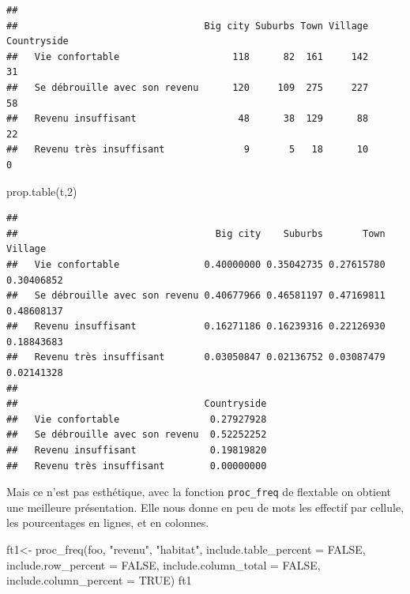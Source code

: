 \documentclass[
]{book}
\newenvironment{Shaded}{\begin{snugshade}}{\end{snugshade}}
\newcommand{\AttributeTok}[1]{\textcolor[rgb]{0.77,0.63,0.00}{#1}}
\newcommand{\ConstantTok}[1]{\textcolor[rgb]{0.00,0.00,0.00}{#1}}
\newcommand{\DecValTok}[1]{\textcolor[rgb]{0.00,0.00,0.81}{#1}}
\newcommand{\FunctionTok}[1]{\textcolor[rgb]{0.00,0.00,0.00}{#1}}
\newcommand{\NormalTok}[1]{#1}
\newcommand{\OtherTok}[1]{\textcolor[rgb]{0.56,0.35,0.01}{#1}}
\newcommand{\SpecialCharTok}[1]{\textcolor[rgb]{0.00,0.00,0.00}{#1}}
\newcommand{\StringTok}[1]{\textcolor[rgb]{0.31,0.60,0.02}{#1}}
\begin{document}
\begin{Shaded}
\end{Shaded}

\begin{verbatim}
##                                
##                                 Big city Suburbs Town Village Countryside
##   Vie confortable                    118      82  161     142          31
##   Se débrouille avec son revenu      120     109  275     227          58
##   Revenu insuffisant                  48      38  129      88          22
##   Revenu très insuffisant              9       5   18      10           0
\end{verbatim}

\begin{Shaded}
\begin{Highlighting}[]
\FunctionTok{prop.table}\NormalTok{(t,}\DecValTok{2}\NormalTok{)}
\end{Highlighting}
\end{Shaded}

\begin{verbatim}
##                                
##                                   Big city    Suburbs       Town    Village
##   Vie confortable               0.40000000 0.35042735 0.27615780 0.30406852
##   Se débrouille avec son revenu 0.40677966 0.46581197 0.47169811 0.48608137
##   Revenu insuffisant            0.16271186 0.16239316 0.22126930 0.18843683
##   Revenu très insuffisant       0.03050847 0.02136752 0.03087479 0.02141328
##                                
##                                 Countryside
##   Vie confortable                0.27927928
##   Se débrouille avec son revenu  0.52252252
##   Revenu insuffisant             0.19819820
##   Revenu très insuffisant        0.00000000
\end{verbatim}

Mais ce n'est pas esthétique, avec la fonction \texttt{proc\_freq} de flextable on obtient une meilleure présentation. Elle nous donne en peu de mots les effectif par cellule, les pourcentages en lignes, et en colonnes.

\begin{Shaded}
\begin{Highlighting}[]
\NormalTok{ft1}\OtherTok{\textless{}{-}} \FunctionTok{proc\_freq}\NormalTok{(foo, }\StringTok{"revenu"}\NormalTok{, }\StringTok{"habitat"}\NormalTok{, }\AttributeTok{include.table\_percent =} \ConstantTok{FALSE}\NormalTok{,}
                \AttributeTok{include.row\_percent =} \ConstantTok{FALSE}\NormalTok{, }\AttributeTok{include.column\_total =} \ConstantTok{FALSE}\NormalTok{,}
  \AttributeTok{include.column\_percent =} \ConstantTok{TRUE}\NormalTok{)}
\NormalTok{ft1}
\end{Highlighting}
\end{Shaded}
\end{document}
